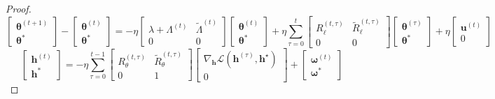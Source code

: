 \begin{proof}
\begin{equation}
        \begin{bmatrix} \boldsymbol{\theta}^{(t+1)} \\ \boldsymbol{\theta}^* \end{bmatrix} -  \begin{bmatrix} \boldsymbol{\theta}^{(t)} \\ \boldsymbol{\theta}^* \end{bmatrix}= -  \eta  \begin{bmatrix}\lambda + \Lambda^{(t)} & \tilde\Lambda^{(t)}\\0 & 0\end{bmatrix}\begin{bmatrix} \boldsymbol{\theta}^{(t)} \\ \boldsymbol{\theta}^* \end{bmatrix} + \eta \sum_{\tau=0}^{t}  \begin{bmatrix} R_\ell^{(t,\tau)} & \tilde{R}_\ell^{(t,\tau)} \\ 0 & 0 \end{bmatrix}\begin{bmatrix} \boldsymbol{\theta}^{(\tau)} \\ \boldsymbol{\theta}^* \end{bmatrix} +  \eta \begin{bmatrix} \boldsymbol{u}^{(t)} \\ 0 \end{bmatrix}
    \end{equation}
    \begin{equation} \label{2402:eq:combined_h}
        \begin{bmatrix} \boldsymbol{h}^{(t)} \\ \boldsymbol{h}^* \end{bmatrix} = -\eta\sum_{\tau=0}^{t-1} \begin{bmatrix}
            R_\theta^{(t,\tau)} & \tilde{R}_\theta^{(t,\tau)} \\ 0 & 1
        \end{bmatrix} \begin{bmatrix} \nabla_{\boldsymbol{h}} \mathcal{L}(\boldsymbol{h}^{(\tau)}, \boldsymbol{h}^\star) \\ 0 \end{bmatrix} + \begin{bmatrix} \boldsymbol{\omega}^{(t)} \\ \boldsymbol{\omega}^* \end{bmatrix}
    \end{equation}

\end{proof}
